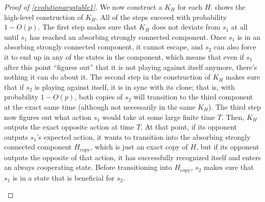 \documentclass[11pt]{amsart}
\theoremstyle{definition}
\theoremstyle{remark}
\begin{document}
\begin{proof}[Proof of \cref{evolutionarystable1}]
      We now construct a $K_H$ for each $H$.  shows the high-level construction of $K_H$.
       All of the steps succeed with probability $1 - O(p)$. The first step makes sure that $K_H$ does not deviate from $s_1$ at all
        until $s_1$ has reached an absorbing strongly connected component. 
       Once $s_1$ is in an absorbing strongly connected component, it cannot escape, and $s_2$ can also force it to end up in any of the states in the component, which means that even if $s_1$ after this point ``figures out'' that it is not playing against itself anymore, there's nothing it can do about it.
      The second step in the construction of $K_H$ makes sure that if $s_2$ is playing against itself, it is in sync with its clone; that is, with probability $1 - O(p)$, both copies of $s_2$ will transition to the third component at the exact same time (although not necessarily in the same $K_H$). 
      The third step now figures out what action $s_1$ would take at some large finite time $T$. 
      Then, $K_H$ outputs the exact opposite action at time $T$. 
      At that point, if its opponent outputs $s_1$'s expected action, it wants to transition into the absorbing strongly connected component $H_\text{copy}$, which is just an exact copy of $H$, but if its opponent outputs the opposite of that action, it has successfully recognized itself and enters an always cooperating state.
      Before transitioning into $H_\text{copy}$, $s_2$ makes sure that $s_1$ is in a state that is beneficial for $s_2$.

      \begin{figure}
        \centering
\end{figure}
\end{proof}
\end{document}
